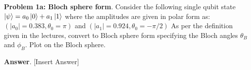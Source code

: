 \textbf{Problem 1a: Bloch sphere form}. Consider the following single qubit state $\ket{\psi} = a_0\ket{0} + a_1\ket{1}$ where the amplitudes are given in polar form as: $(|a_0| = 0.383, \theta_0 = \pi)$ and $(|a_1| = 0.924, \theta_0 = -\pi /2)$ 
As per the definition given in the lectures, convert to Bloch sphere form specifying the Bloch angles $\theta_B$ and $\phi_B$. Plot on the Bloch sphere.


\textbf{Answer}. [Insert Answer]


